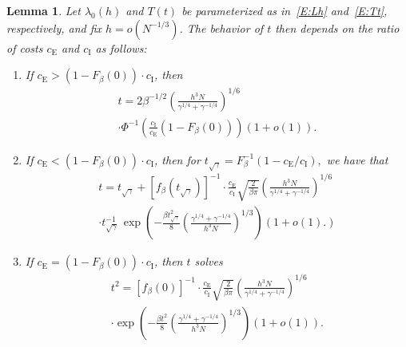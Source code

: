 \documentclass[final]{IEEEtran} %
\newtheorem{lemma}{Lemma}
\newcommand{\ulambda}{\lambda_0}
\newcommand{\ce}{c_\text{E}}
\newcommand{\ci}{c_\text{I}}
\begin{document}
\begin{lemma}\label{L:thresh-small-h}
    Let  $\ulambda(h)$ and $T(t)$ be parameterized as in~\eqref{E:Lh} and~\eqref{E:Tt}, respectively, and fix $h = o\left(N^{-1/3}\right)$.  The behavior of $t$ then depends on the ratio of costs $\ce$ and $\ci$ as follows:
    \begin{enumerate}
    \item If $\ce > (1 -  F_\beta(0)) \cdot \ci$, then
    \begin{multline*}
        t
        =
        2
        \beta^{-1/2}
        \left(
            \frac{h^3 N}{ \gamma^{1/4} + \gamma^{-1/4} }
        \right)^{1/6}
        \\
        \cdot
        \Phi^{-1} \! \left(
            \frac{\ci}{\ce}
            \left(
                1 - F_\beta(0)
            \right)
        \right)
        \left(
            1 + o(1)
        \right).
    \end{multline*}
    \item If $\ce < (1 -  F_\beta(0)) \cdot \ci$, then for
    \(
        t_{\sqrt{\gamma}}
        =
        F_\beta^{-1} \!\left( 1 - \ce/\ci \right),
    \)
    we have that
    \begin{multline*}
        t
        =
        t_{\sqrt{\gamma}}
        +
        \left[
            f_\beta \left( t_{\sqrt{\gamma}} \right)
        \right]^{-1}
        \cdot
        \frac{\ce}{\ci}
        \sqrt{\frac{2}{\beta \pi}}
        \left(
            \frac{ h^3 N }{\gamma^{1/4} + \gamma^{-1/4}}
        \right)^{1/6}
        \\
        \cdot
        t_{\sqrt{\gamma}}^{-1} \,
        \exp\!\left(
            -
            \frac{\beta t_{\sqrt{\gamma}}^2}{8}
            \left(
                \frac{\gamma^{1/4} + \gamma^{-1/4}}{ h^3 N }
            \right)^{1/3}
        \right)
        \left(
            1 + o(1).
        \right)
    \end{multline*}
    \item If $\ce = (1 -  F_\beta(0)) \cdot \ci$, then $t$ solves
    \begin{multline*}
        t^2
        =
        \left[
               f_\beta ( 0 )
        \right]^{-1}
        \cdot
        \frac{\ce}{\ci}
        \sqrt{\frac{2}{\beta \pi}}
        \left(
            \frac{ h^3 N }{\gamma^{1/4} + \gamma^{-1/4}}
        \right)^{1/6}
        \\
        \cdot
        \exp \!\left(
            -
            \frac{\beta t^2}{8}
            \left(
                \frac{\gamma^{1/4} + \gamma^{-1/4}}{ h^3 N }
            \right)^{1/3}
        \right)
        \left(
            1 + o\left( 1 \right)
        \right).
    \end{multline*}
    \end{enumerate}
\end{lemma}
\end{document}
